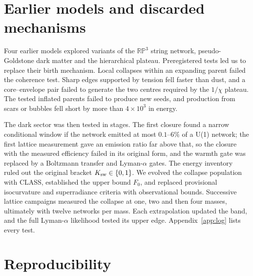 \documentclass[11pt,a4paper]{article}
\newcommand{\RP}{\mathbb{RP}^3}
\begin{document}
\section{Earlier models and discarded mechanisms}
\label{sec:history}

Four earlier models explored variants of the $\RP$ string network, pseudo-Goldstone dark matter and the hierarchical plateau. Preregistered tests led us to replace their birth mechanism. Local collapses within an expanding parent failed the coherence test. Sharp edges supported by tension fell faster than dust, and a core--envelope pair failed to generate the two centres required by the $1/\chi$ plateau. The tested inflated parents failed to produce new seeds, and production from scars or bubbles fell short by more than $4\times10^3$ in energy.

The dark sector was then tested in stages.
The first closure found a narrow conditional window if the network emitted at most $0.1$--$6\%$ of a U(1) network; the first lattice measurement gave an emission ratio far above that, so the closure with the measured efficiency failed in its original form, and the warmth gate was replaced by a Boltzmann transfer and Lyman-$\alpha$ gates.
The energy inventory ruled out the original bracket $K_{\rm sw}\in\{0,1\}$. We evolved the collapse population with CLASS, established the upper bound $F_0$, and replaced provisional isocurvature and superradiance criteria with observational bounds.
Successive lattice campaigns measured the collapse at one, two and then four masses, ultimately with twelve networks per mass. Each extrapolation updated the band, and the full Lyman-$\alpha$ likelihood tested its upper edge.
Appendix~\ref{app:log} lists every test.

\section{Reproducibility}
\label{sec:repro}
\end{document}
